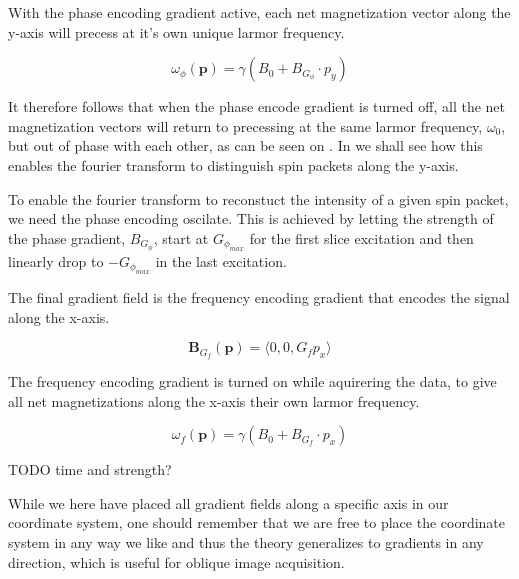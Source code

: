 With the phase encoding gradient active, each net magnetization vector
along the y-axis will precess at it's own unique larmor frequency. 

\begin{displaymath}
  \omega_\phi(\mathbf{p}) = \gamma (B_0 + B_{G_\phi} \cdot p_y)
\end{displaymath}

It therefore follows that when the phase encode gradient is turned
off, all the net magnetization vectors will return to precessing at
the same larmor frequency, $\omega_0$, but out of phase with each
other, as can be seen on . In
 we shall see how this enables the fourier
transform to distinguish spin packets along the y-axis.

To enable the fourier transform to reconstuct the intensity of a given
spin packet, we need the phase encoding oscilate. This is achieved by
letting the strength of the phase gradient, $B_{G_\phi}$, start at
$G_{\phi_{max}}$ for the first slice excitation and then linearly drop to
$-G_{\phi_{max}}$ in the last excitation.





The final gradient field is the frequency encoding gradient that
encodes the signal along the x-axis.

\begin{displaymath}
  \mathbf{B}_{G_f}(\mathbf{p}) = \langle 0, 0, G_f p_x \rangle
\end{displaymath}

The frequency encoding gradient is turned on while aquirering the
data, to give all net magnetizations along the x-axis their own larmor
frequency.

\begin{displaymath}
  \omega_f(\mathbf{p}) = \gamma (B_0 + B_{G_f} \cdot p_x)
\end{displaymath}

TODO time and strength?

While we here have placed all gradient fields along a specific axis in
our coordinate system, one should remember that we are free to place
the coordinate system in any way we like and thus the theory
generalizes to gradients in any direction, which is useful for oblique
image acquisition.






